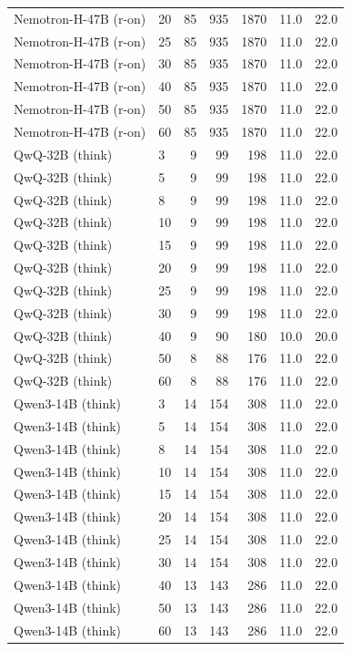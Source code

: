 \documentclass[conference]{IEEEtran}
\theoremstyle{remark}
\begin{document}
\begin{longtable}{llrrrrr}
Nemotron-H-47B (r-on) & 20 & 85 & 935 & 1870 & 11.0 & 22.0 \\
Nemotron-H-47B (r-on) & 25 & 85 & 935 & 1870 & 11.0 & 22.0 \\
Nemotron-H-47B (r-on) & 30 & 85 & 935 & 1870 & 11.0 & 22.0 \\
Nemotron-H-47B (r-on) & 40 & 85 & 935 & 1870 & 11.0 & 22.0 \\
Nemotron-H-47B (r-on) & 50 & 85 & 935 & 1870 & 11.0 & 22.0 \\
Nemotron-H-47B (r-on) & 60 & 85 & 935 & 1870 & 11.0 & 22.0 \\
QwQ-32B (think) & 3 & 9 & 99 & 198 & 11.0 & 22.0 \\
QwQ-32B (think) & 5 & 9 & 99 & 198 & 11.0 & 22.0 \\
QwQ-32B (think) & 8 & 9 & 99 & 198 & 11.0 & 22.0 \\
QwQ-32B (think) & 10 & 9 & 99 & 198 & 11.0 & 22.0 \\
QwQ-32B (think) & 15 & 9 & 99 & 198 & 11.0 & 22.0 \\
QwQ-32B (think) & 20 & 9 & 99 & 198 & 11.0 & 22.0 \\
QwQ-32B (think) & 25 & 9 & 99 & 198 & 11.0 & 22.0 \\
QwQ-32B (think) & 30 & 9 & 99 & 198 & 11.0 & 22.0 \\
QwQ-32B (think) & 40 & 9 & 90 & 180 & 10.0 & 20.0 \\
QwQ-32B (think) & 50 & 8 & 88 & 176 & 11.0 & 22.0 \\
QwQ-32B (think) & 60 & 8 & 88 & 176 & 11.0 & 22.0 \\
Qwen3-14B (think) & 3 & 14 & 154 & 308 & 11.0 & 22.0 \\
Qwen3-14B (think) & 5 & 14 & 154 & 308 & 11.0 & 22.0 \\
Qwen3-14B (think) & 8 & 14 & 154 & 308 & 11.0 & 22.0 \\
Qwen3-14B (think) & 10 & 14 & 154 & 308 & 11.0 & 22.0 \\
Qwen3-14B (think) & 15 & 14 & 154 & 308 & 11.0 & 22.0 \\
Qwen3-14B (think) & 20 & 14 & 154 & 308 & 11.0 & 22.0 \\
Qwen3-14B (think) & 25 & 14 & 154 & 308 & 11.0 & 22.0 \\
Qwen3-14B (think) & 30 & 14 & 154 & 308 & 11.0 & 22.0 \\
Qwen3-14B (think) & 40 & 13 & 143 & 286 & 11.0 & 22.0 \\
Qwen3-14B (think) & 50 & 13 & 143 & 286 & 11.0 & 22.0 \\
Qwen3-14B (think) & 60 & 13 & 143 & 286 & 11.0 & 22.0 \\

\end{longtable}
\end{document}
